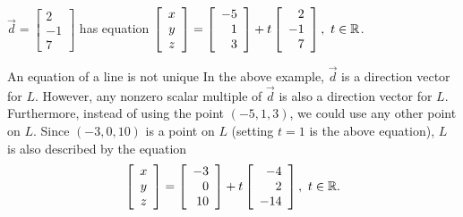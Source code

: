 \documentclass[pdf,handout]{beamer}
\begin{document}
{{\begin{example}
$\vec{d}=\left[\begin{array}{r} 2 \\ -1 \\ 7 \end{array}\right]$
\pause
has equation
$\left[\begin{array}{c} x \\ y \\ z \end{array}\right] 
=
\left[\begin{array}{r} -5 \\ 1 \\ 3 \end{array}\right] 
+t \left[\begin{array}{r} 2 \\ -1 \\ 7 \end{array}\right],
~t\in\mathbb{R}$.
\end{example}
\pause
\begin{alertblock}{An equation of a line is not unique}
In the above example, $\vec{d}$ is a direction vector for $L$.
\pause
However, \alert{any nonzero scalar multiple} of $\vec{d}$ is also
a direction vector for $L$.
\pause
Furthermore,
instead of using the point $(-5,1,3)$, we could use any other point
on $L$.  
\pause
Since $(-3,0,10)$ is a point on $L$ (setting $t=1$ is the above
equation), $L$ is also described by the equation
\[ \left[\begin{array}{c} x \\ y \\ z \end{array}\right] 
=
\left[\begin{array}{r} -3 \\ 0 \\ 10 \end{array}\right] 
+t \left[\begin{array}{r} -4 \\ 2 \\ -14 \end{array}\right],
~t\in\mathbb{R}. \]
\end{alertblock}
}



}
\end{document}
